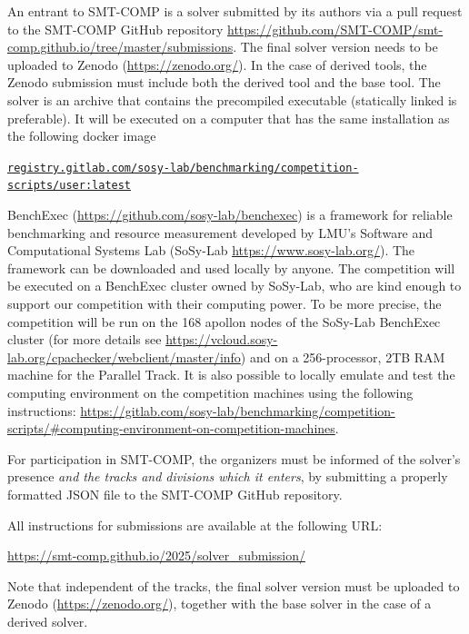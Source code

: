 \documentclass[12pt]{article}
\begin{document}
%
An entrant to SMT-COMP is a solver submitted by its authors via
a pull request to the SMT-COMP GitHub repository
\url{https://github.com/SMT-COMP/smt-comp.github.io/tree/master/submissions}.
The final solver version needs to be uploaded to Zenodo (\url{https://zenodo.org/}).
In the case of derived tools, the Zenodo submission must include both the derived tool and the base tool.
The solver is an archive that contains the precompiled executable (statically linked is preferable).
It will be executed on a computer that has the same installation as the following docker image
\begin{center}
  \footnotesize
\texttt{\url{registry.gitlab.com/sosy-lab/benchmarking/competition-scripts/user:latest}}
\end{center}


%
BenchExec (\url{https://github.com/sosy-lab/benchexec}) is a framework for reliable benchmarking and resource
measurement developed by LMU's Software and Computational Systems Lab (SoSy-Lab \url{https://www.sosy-lab.org/}).
The framework can be downloaded and used locally by anyone.
The competition will be executed on a BenchExec cluster owned by SoSy-Lab,
who are kind enough to support our competition with their computing power.
To be more precise, the competition will be run on the 168 apollon nodes of the
SoSy-Lab BenchExec cluster (for more details see \url{https://vcloud.sosy-lab.org/cpachecker/webclient/master/info}) and on a 256-processor, 2TB RAM machine for the Parallel Track.
It is also possible to locally emulate and test the computing environment on
the competition machines using the following instructions:
\url{https://gitlab.com/sosy-lab/benchmarking/competition-scripts/#computing-environment-on-competition-machines}.

%
For participation in SMT-COMP, the organizers must be informed of the solver's presence
\emph{and the tracks and divisions which it enters}, by submitting a properly formatted
JSON file to the SMT-COMP GitHub repository.

All instructions for submissions are available at the following URL:
\begin{center}
  \url{https://smt-comp.github.io/2025/solver_submission/}
\end{center}

Note that independent of the tracks, the final solver version must be uploaded
to Zenodo (\url{https://zenodo.org/}), together with the base solver in the case of a
derived solver.
\end{document}
